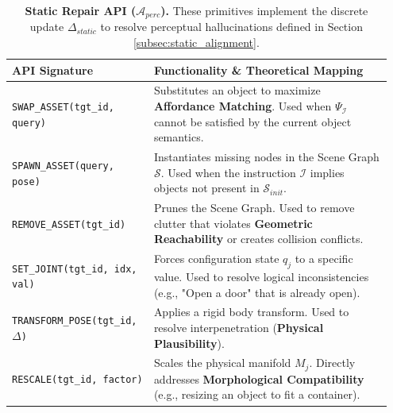 \documentclass{article}
\theoremstyle{plain}
\theoremstyle{definition}
\theoremstyle{remark}
\begin{document}
\begin{table}[h]
\caption{\textbf{Static Repair API ($\mathcal{A}_{perc}$).} These primitives implement the discrete update $\Delta_{static}$ to resolve perceptual hallucinations defined in Section \ref{subsec:static_alignment}.}
\label{tab:static_api}
\begin{center}
\begin{small}
\begin{tabular}{p{0.35\linewidth} p{0.6\linewidth}}
\toprule
\textbf{API Signature} & \textbf{Functionality \& Theoretical Mapping} \\
\midrule
\texttt{SWAP\_ASSET(tgt\_id, query)} & Substitutes an object to maximize \textbf{Affordance Matching}. Used when $\Psi_{\mathcal{I}}$ cannot be satisfied by the current object semantics. \\
\midrule
\texttt{SPAWN\_ASSET(query, pose)} & Instantiates missing nodes in the Scene Graph $\mathcal{S}$. Used when the instruction $\mathcal{I}$ implies objects not present in $\mathcal{S}_{init}$. \\
\midrule
\texttt{REMOVE\_ASSET(tgt\_id)} & Prunes the Scene Graph. Used to remove clutter that violates \textbf{Geometric Reachability} or creates collision conflicts. \\
\midrule
\texttt{SET\_JOINT(tgt\_id, idx, val)} & Forces configuration state $q_j$ to a specific value. Used to resolve logical inconsistencies (e.g., "Open a door" that is already open). \\
\midrule
\texttt{TRANSFORM\_POSE(tgt\_id, $\Delta$)} & Applies a rigid body transform. Used to resolve interpenetration (\textbf{Physical Plausibility}). \\
\midrule
\texttt{RESCALE(tgt\_id, factor)} & Scales the physical manifold $M_j$. Directly addresses \textbf{Morphological Compatibility} (e.g., resizing an object to fit a container). \\
\bottomrule
\end{tabular}
\end{small}
\end{center}
\end{table}
\end{document}
